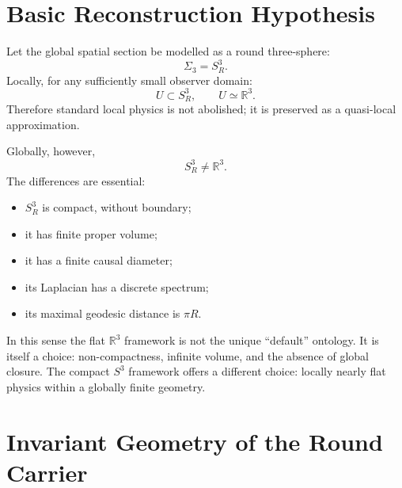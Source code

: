 \documentclass[aps,prd,onecolumn,superscriptaddress,longbibliography,nofootinbib,notitlepage]{revtex4-2}
\begin{document}
\section{Basic Reconstruction Hypothesis}
\label{sec:hypothesis}

Let the global spatial section be modelled as a round three-sphere:
\begin{equation}
  \Sigma_3 = S^3_R.
\end{equation}
Locally, for any sufficiently small observer domain:
\begin{equation}
  U \subset S^3_R, \qquad U \simeq \mathbb{R}^3.
\end{equation}
Therefore standard local physics is not abolished; it is preserved as a
quasi-local approximation.

Globally, however,
\begin{equation}
  S^3_R \neq \mathbb{R}^3.
\end{equation}
The differences are essential:
\begin{itemize}
  \item $S^3_R$ is compact, without boundary;
  \item it has finite proper volume;
  \item it has a finite causal diameter;
  \item its Laplacian has a discrete spectrum;
  \item its maximal geodesic distance is $\pi R$.
\end{itemize}

In this sense the flat $\mathbb{R}^3$ framework is not the unique ``default''
ontology. It is itself a choice: non-compactness, infinite volume, and the absence
of global closure. The compact $S^3$ framework offers a different choice: locally
nearly flat physics within a globally finite geometry.


\section{Invariant Geometry of the Round Carrier}
\label{sec:round-invariants}
\end{document}
